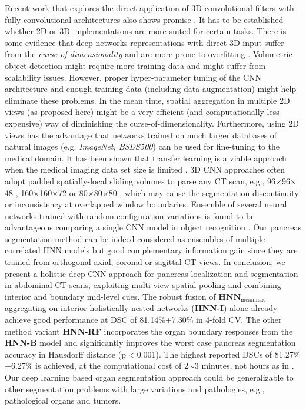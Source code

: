 \documentclass[journal]{IEEEtran}
\begin{document}
Recent work that explores the direct application of 3D convolutional filters with fully convolutional architectures also shows promise \cite{ronneberger2015unet,Merkow2016Dense}. It has to be established whether 2D or 3D implementations are more suited for certain tasks. There is some evidence that deep networks representations with direct 3D input suffer from the \textit{curse-of-dimensionality} and are more prone to overfitting \cite{roth2016improving,Su2015Multi,Su2016Volumetric}. Volumetric object detection might require more training data and might suffer from scalability issues. However, proper hyper-parameter tuning of the CNN architecture and enough training data (including data augmentation) might help eliminate these problems. In the mean time, spatial aggregation in multiple 2D views (as proposed here) might be a very efficient (and computationally less expensive) way of diminishing the curse-of-dimensionality. Furthermore, using 2D views has the advantage that networks trained on much larger databases of natural images (e.g. \textit{ImageNet, BSDS500}) can be used for fine-tuning to the medical domain. It has been shown that transfer learning is a viable approach when the medical imaging data set size is limited \cite{Shin2016Deep,tajbakhsh2016convolutional}. 3D CNN approaches often adopt padded spatially-local sliding volumes to parse any CT scan, e.g., 96$\times$96$\times$48 \cite{Merkow2016Dense}, 160$\times$160$\times$72 \cite{Dou20163D} or 80$\times$80$\times$80 \cite{Chen2016VoxResNet}, which may cause the segmentation discontinuity or inconsistency at overlapped window boundaries. Ensemble of several neural networks trained with random configuration variations is found to be advantageous comparing a single CNN model in object recognition \cite{simonyan2014very,krizhevsky2012imagenet,Simonyan2014Two}. Our pancreas segmentation method can be indeed considered as ensembles of multiple correlated HNN models but good complementary information gain since they are trained from orthogonal axial, coronal or sagittal CT views.  
In conclusion, we present a holistic deep CNN approach for pancreas localization and segmentation in abdominal CT scans, exploiting multi-view spatial pooling and combining interior and boundary mid-level cues. The robust fusion of $\mathbf{HNN}_\mathrm{meanmax}$ aggregating on interior holistically-nested networks ({\bf HNN-I}) alone already achieve good performance at DSC of 81.14\%$\pm$7.30\% in 4-fold CV. The other method variant \textbf{HNN-RF} incorporates the organ boundary responses from the {\bf HNN-B} model and significantly improves the worst case pancreas segmentation accuracy in Hausdorff distance (p$<$0.001). The highest reported DSCs of 81.27\%$\pm$6.27\% is achieved, at the computational cost of 2$\sim$3 minutes, not hours as in \cite{Wang2014Miccai,Chu2013Miccai,wolz2013automated}. Our deep learning based organ segmentation approach could be generalizable to other segmentation problems with large variations and pathologies, e.g., pathological organs and tumors.
\end{document}
